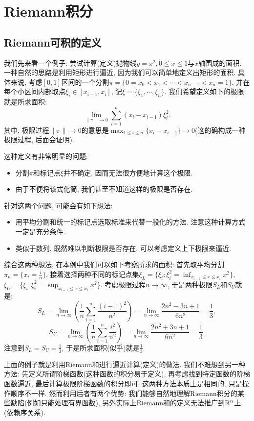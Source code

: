 \chapter{Riemann积分}

\section{Riemann可积的定义}

我们先来看一个例子: 尝试计算(定义)抛物线$y=x^2,0\leq x \leq 1$与$x$轴围成的面积. 一种自然的思路是利用矩形进行逼近, 因为我们可以简单地定义出矩形的面积. 具体来说, 考虑$[0,1]$区间的一个分割$\pi = \{ 0=x_0<x_1<\cdots <x_{n-1}<x_n=1 \}$, 并在每个小区间内部取点$\xi _i \in [x_{i-1},x_i]$, 记$\xi = \{ \xi _1,\cdots ,\xi _n \}$. 我们希望定义如下的极限就是所求面积: $$\lim_{\| \pi \| \to 0} \sum_{i=1}^{n}(x_i-x_{i-1})\xi _i^2. $$
其中, 极限过程$\| \pi \| \to 0$的意思是$\max_{1\leq i \leq n} \{x_i-x_{i-1}\} \to 0$(这的确构成一种极限过程, 后面会证明). 

这种定义有非常明显的问题: 
\begin{itemize}
	\item 分割$\pi$和标记点$\xi$并不确定, 因而无法很方便地计算这个极限. 
	\item 由于不便将该式化简, 我们甚至不知道这样的极限是否存在. 
\end{itemize}
针对这两个问题, 可能会有如下想法: 
\begin{itemize}
	\item 用平均分割和统一的标记点选取标准来代替一般化的方法. 注意这种计算方式一定是充分条件. 
	\item 类似于数列, 既然难以判断极限是否存在, 可以考虑定义上下极限来逼近. 
\end{itemize}
综合这两种想法, 在本例中我们可以如下考察所求的面积: 首先取平均分割$\pi_{n}=\{ x_i=\frac{i}{n} \}$, 接着选择两种不同的标记点集$\displaystyle\xi _L = \big\{ \xi _i :  \xi _i ^2= \inf_{x_{i-1} \leq x \leq x_i} x^2 \big\}$, $\displaystyle\xi _U = \big\{ \xi _i : \xi _i ^2= \sup_{x_{i-1} \leq x \leq x_i} x^2 \big\}$. 考虑极限过程$n\to \infty$, 于是两种极限$S_L$和$S_U$就是: $$S_L = \lim_{n\to \infty} \left( \frac{1}{n} \sum_{i=1}^{n} \frac{(i-1)^2}{n^2} \right) = \lim_{n\to \infty} \frac{2n^2-3n+1}{6n^2} = \frac{1}{3} ,  $$
$$S_U = \lim_{n\to \infty} \left( \frac{1}{n} \sum_{i=1}^{n} \frac{i^2}{n^2} \right) = \lim_{n\to \infty} \frac{2n^2+3n+1}{6n^2} = \frac{1}{3}.$$
注意到$S_L=S_U = \frac{1}{3}$, 于是所求面积(似乎)就是$\frac{1}{3}$. 

上面的例子就是利用Riemann和进行逼近计算(定义)的做法. 我们不难想到另一种方法: 先定义所谓阶梯函数(这种函数的积分易于定义), 再考虑找到特定函数的阶梯函数逼近, 最后计算极限阶梯函数的积分即可. 这两种方法本质上是相同的, 只是操作顺序不一样. 然而利用后者有两个优势: 我们能够自然地理解Riemann积分的某些缺陷(例如只能处理有界函数), 另外实际上Riemann和的定义无法推广到$\mathbb{R} ^n$上(依赖序关系). 


